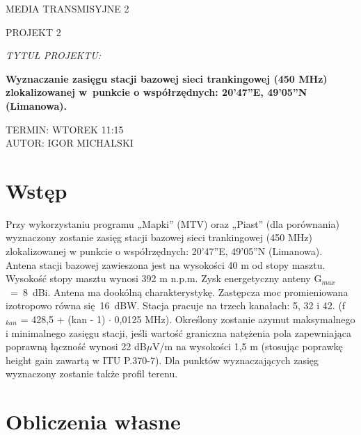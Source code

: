 \documentclass[12pt, a4paper, oneside]{article}
\begin{document}
\begin{titlepage}
\vspace*{7\baselineskip}
\begin{center}
{\Huge MEDIA TRANSMISYJNE 2}
\end{center}
\vspace*{\baselineskip}
\begin{center}
{\Large PROJEKT 2}
\end{center}
\vspace*{5\baselineskip}
{\it TYTUŁ PROJEKTU:}
\begin{center}
{\bf\large Wyznaczanie zasięgu stacji bazowej sieci trankingowej (450 MHz) zlokalizowanej w~punkcie o współrzędnych: 20’47”E, 49’05”N (Limanowa).} 
\end{center}
\vspace*{10\baselineskip}
\raggedleft
TERMIN: WTOREK 11:15\\
AUTOR: IGOR MICHALSKI
\end{titlepage}
\section{Wstęp}
\indent\indent Przy wykorzystaniu programu „Mapki” (MTV) oraz „Piast” (dla porównania) wyznaczony zostanie zasięg stacji bazowej sieci trankingowej (450 MHz) zlokalizowanej w punkcie o współrzędnych: 20’47”E, 49’05”N (Limanowa). Antena stacji bazowej zawieszona jest na wysokości 40 m od stopy masztu. Wysokość stopy masztu wynosi 392 m n.p.m. Zysk energetyczny anteny G$_{max}$~=~8~dBi. Antena ma dookólną charakterystykę. Zastępcza moc promieniowana izotropowo równa się~16~dBW. Stacja pracuje na trzech kanałach: 5, 32 i 42. (f$_{kan}$ = 428,5 + (kan - 1) $\cdot$ 0,0125 MHz). Określony zostanie azymut maksymalnego i minimalnego  zasięgu  stacji,  jeśli  wartość  graniczna natężenia  pola  zapewniająca  poprawną łączność wynosi 22 dB$\mu$V/m na wysokości 1,5 m (stosując poprawkę height gain zawartą w ITU P.370-7). Dla punktów wyznaczających zasięg wyznaczony zostanie także profil terenu.
\section{Obliczenia własne}
\end{document}
